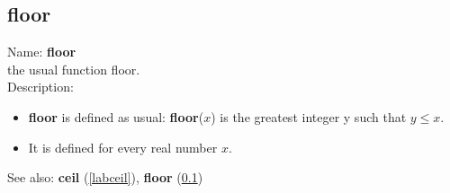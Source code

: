 \subsection{floor}
\label{labfloor}
\noindent Name: \textbf{floor}\\
the usual function floor.\\
\noindent Description: \begin{itemize}

\item \textbf{floor} is defined as usual: \textbf{floor}($x$) is the greatest integer y such that $y \le x$.

\item It is defined for every real number $x$.
\end{itemize}
See also: \textbf{ceil} (\ref{labceil}), \textbf{floor} (\ref{labfloor})
